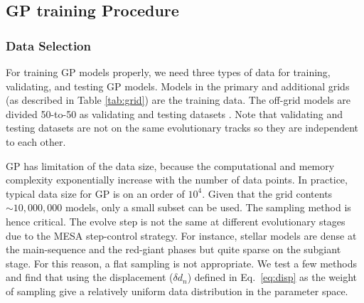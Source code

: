 \subsection{GP training Procedure}\label{workflow}
  
\subsubsection{Data Selection}

For training GP models properly, we need three types of data for training, validating, and testing GP models. 
%
Models in the primary and additional grids (as described in Table \ref{tab:grid}) are the training data. The off-grid models are divided 50-to-50 as validating and testing datasets . Note that validating and testing datasets are not on the same evolutionary tracks so they are independent to each other. 
%

GP has limitation of the data size, because the computational and memory complexity exponentially increase with the number of data points.  In practice, typical data size for GP is on an order of $10^{4}$. Given that the grid contents $\sim 10,000,000$ models, only a small subset can be used. The sampling method is hence critical.
%
The evolve step is not the same at different evolutionary stages due to the \textsc{MESA} step-control strategy. For instance, stellar models are dense at the main-sequence and the red-giant phases but quite sparse on the subgiant stage. For this reason, a flat sampling is not appropriate.   
We test a few methods and find that using the displacement ($\delta d_{n}$) defined in Eq.~\ref{eq:disp} as the weight of sampling give a relatively uniform data distribution in the parameter space. 

